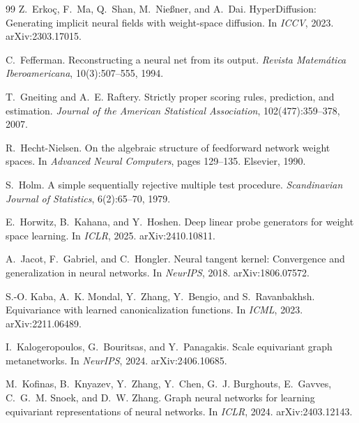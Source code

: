 \begin{thebibliography}{99}
Z.~Erko\c{c}, F.~Ma, Q.~Shan, M.~Nie\ss{}ner, and A.~Dai.
\newblock HyperDiffusion: Generating implicit neural fields with weight-space diffusion.
\newblock In \emph{ICCV}, 2023. arXiv:2303.17015.

C.~Fefferman.
\newblock Reconstructing a neural net from its output.
\newblock \emph{Revista Matem\'atica Iberoamericana}, 10(3):507--555, 1994.

T.~Gneiting and A.~E. Raftery.
\newblock Strictly proper scoring rules, prediction, and estimation.
\newblock \emph{Journal of the American Statistical Association}, 102(477):359--378, 2007.

R.~Hecht-Nielsen.
\newblock On the algebraic structure of feedforward network weight spaces.
\newblock In \emph{Advanced Neural Computers}, pages 129--135. Elsevier, 1990.

S.~Holm.
\newblock A simple sequentially rejective multiple test procedure.
\newblock \emph{Scandinavian Journal of Statistics}, 6(2):65--70, 1979.

E.~Horwitz, B.~Kahana, and Y.~Hoshen.
\newblock Deep linear probe generators for weight space learning.
\newblock In \emph{ICLR}, 2025. arXiv:2410.10811.

A.~Jacot, F.~Gabriel, and C.~Hongler.
\newblock Neural tangent kernel: Convergence and generalization in neural networks.
\newblock In \emph{NeurIPS}, 2018. arXiv:1806.07572.

S.-O. Kaba, A.~K. Mondal, Y.~Zhang, Y.~Bengio, and S.~Ravanbakhsh.
\newblock Equivariance with learned canonicalization functions.
\newblock In \emph{ICML}, 2023. arXiv:2211.06489.

I.~Kalogeropoulos, G.~Bouritsas, and Y.~Panagakis.
\newblock Scale equivariant graph metanetworks.
\newblock In \emph{NeurIPS}, 2024. arXiv:2406.10685.

M.~Kofinas, B.~Knyazev, Y.~Zhang, Y.~Chen, G.~J. Burghouts, E.~Gavves, C.~G.~M. Snoek, and
D.~W. Zhang.
\newblock Graph neural networks for learning equivariant representations of neural networks.
\newblock In \emph{ICLR}, 2024. arXiv:2403.12143.


\end{thebibliography}
